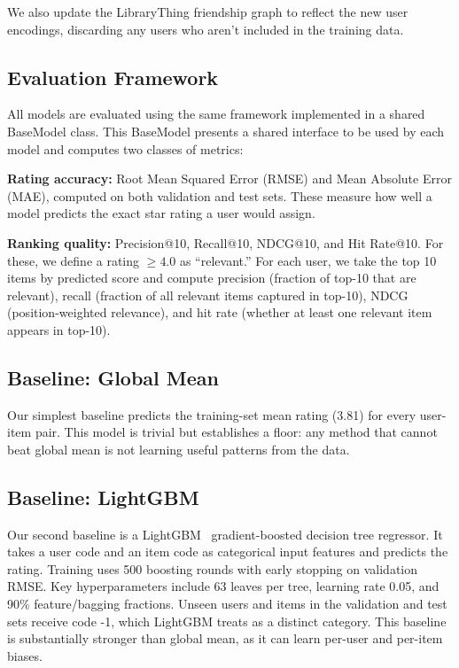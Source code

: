 \documentclass[conference]{IEEEtran}
\begin{document}
We also update the LibraryThing friendship graph to reflect the new user
encodings, discarding any users who aren't included in the training data.

\subsection{Evaluation Framework}

All models are evaluated using the same framework implemented in a shared 
BaseModel class. This BaseModel presents a shared interface to be used by each
model and computes two classes of metrics:

\textbf{Rating accuracy:} Root Mean Squared Error (RMSE) and Mean Absolute 
Error (MAE), computed on both validation and test sets. These measure how well 
a model predicts the exact star rating a user would assign.

\textbf{Ranking quality:} Precision@10, Recall@10, NDCG@10, and Hit Rate@10. 
For these, we define a rating $\geq 4.0$ as ``relevant.'' For each user, we 
take the top 10 items by predicted score and compute precision (fraction of 
top-10 that are relevant), recall (fraction of all relevant items captured in 
top-10), NDCG (position-weighted relevance), and hit rate (whether at least one 
relevant item appears in top-10).

\subsection{Baseline: Global Mean}

Our simplest baseline predicts the training-set mean rating (3.81) for every 
user-item pair. This model is trivial but establishes a floor: any method that 
cannot beat global mean is not learning useful patterns from the data.

\subsection{Baseline: LightGBM}

Our second baseline is a LightGBM~\cite{ke2017lightgbm} gradient-boosted 
decision tree regressor. It takes a user code and an item code as categorical 
input features and predicts the rating. Training uses 500 boosting rounds with 
early stopping on validation RMSE. Key hyperparameters include 63 leaves per 
tree, learning rate 0.05, and 90\% feature/bagging fractions. Unseen users and 
items in the validation and test sets receive code -1, which LightGBM treats as 
a distinct category. This baseline is substantially stronger than global mean, 
as it can learn per-user and per-item biases.
\end{document}
